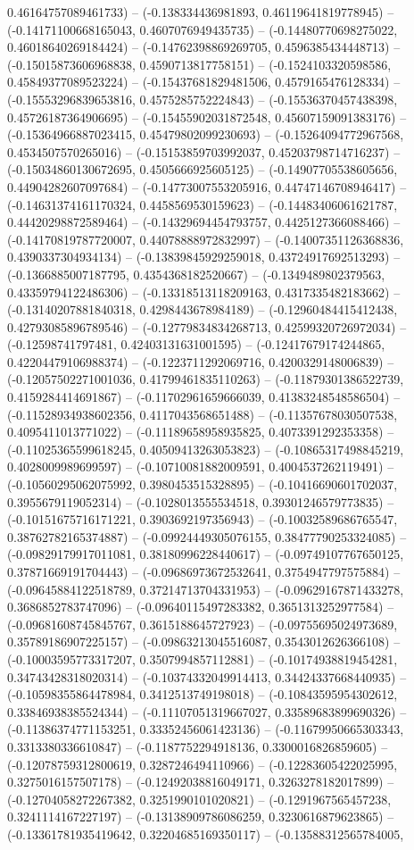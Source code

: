 0.46164757089461733) -- (-0.138334436981893, 0.46119641819778945) -- (-0.14171100668165043, 0.4607076949435735) -- (-0.14480770698275022, 0.46018640269184424) -- (-0.14762398869269705, 0.4596385434448713) -- (-0.15015873606968838, 0.4590713817758151) -- (-0.1524103320598586, 0.45849377089523224) -- (-0.15437681829481506, 0.4579165476128334) -- (-0.15553296839653816, 0.4575285752224843) -- (-0.15536370457438398, 0.45726187364906695) -- (-0.15455902031872548, 0.45607159091383176) -- (-0.15364966887023415, 0.45479802099230693) -- (-0.15264094772967568, 0.4534507570265016) -- (-0.15153859703992037, 0.45203798714716237) -- (-0.15034860130672695, 0.4505666925605125) -- (-0.14907705538605656, 0.44904282607097684) -- (-0.14773007553205916, 0.44747146708946417) -- (-0.14631374161170324, 0.4458569530159623) -- (-0.14483406061621787, 0.44420298872589464) -- (-0.14329694454793757, 0.4425127366088466) -- (-0.14170819787720007, 0.44078888972832997) -- (-0.14007351126368836, 0.4390337304934134) -- (-0.13839845929259018, 0.43724917692513293) -- (-0.1366885007187795, 0.4354368182520667) -- (-0.1349489802379563, 0.43359794122486306) -- (-0.13318513118209163, 0.4317335482183662) -- (-0.13140207881840318, 0.4298443678984189) -- (-0.12960484415412438, 0.42793085896789546) -- (-0.12779834834268713, 0.42599320726972034) -- (-0.12598741797481, 0.42403131631001595) -- (-0.12417679174244865, 0.42204479106988374) -- (-0.1223711292069716, 0.4200329148006839) -- (-0.12057502271001036, 0.41799461835110263) -- (-0.11879301386522739, 0.4159284414691867) -- (-0.11702961659666039, 0.41383248548586504) -- (-0.11528934938602356, 0.4117043568651488) -- (-0.11357678030507538, 0.4095411013771022) -- (-0.11189658958935825, 0.4073391292353358) -- (-0.11025365599618245, 0.40509413263053823) -- (-0.10865317498845219, 0.4028009989699597) -- (-0.10710081882009591, 0.4004537262119491) -- (-0.10560295062075992, 0.3980453515328895) -- (-0.10416690601702037, 0.3955679119052314) -- (-0.1028013555534518, 0.39301246579773835) -- (-0.10151675716171221, 0.3903692197356943) -- (-0.10032589686765547, 0.38762782165374887) -- (-0.09924449305076155, 0.38477790253324085) -- (-0.09829179917011081, 0.38180996228440617) -- (-0.09749107767650125, 0.37871669191704443) -- (-0.09686973672532641, 0.3754947797575884) -- (-0.09645884122518789, 0.37214713704331953) -- (-0.09629167871433278, 0.3686852783747096) -- (-0.09640115497283382, 0.3651313252977584) -- (-0.09681608745845767, 0.3615188645727923) -- (-0.09755695024973689, 0.35789186907225157) -- (-0.09863213045516087, 0.3543012626366108) -- (-0.10003595773317207, 0.3507994857112881) -- (-0.10174938819454281, 0.34743428318020314) -- (-0.10374332049914413, 0.34424337668440935) -- (-0.10598355864478984, 0.3412513749198018) -- (-0.10843595954302612, 0.33846938385524344) -- (-0.11107051319667027, 0.33589683899690326) -- (-0.11386374771153251, 0.33352456061423136) -- (-0.11679950665303343, 0.3313380336610847) -- (-0.1187752294918136, 0.3300016826859605) -- (-0.12078759312800619, 0.3287246494110966) -- (-0.12283605422025995, 0.3275016157507178) -- (-0.12492038816049171, 0.3263278182017899) -- (-0.12704058272267382, 0.3251990101020821) -- (-0.1291967565457238, 0.3241114167227197) -- (-0.13138909786086259, 0.3230616879623865) -- (-0.13361781935419642, 0.32204685169350117) -- (-0.13588312565784005, 